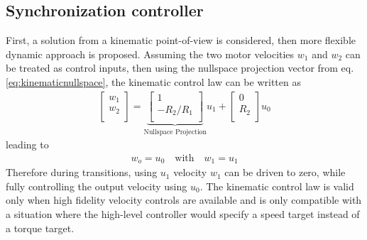 \subsection{Synchronization controller}
First, a solution from a kinematic point-of-view is considered, then more flexible dynamic approach is proposed. Assuming the two motor velocities $w_1$ and $w_2$ can be treated as control inputs, then using the nullspace projection vector from eq.\eqref{eq:kinematicnullspace}, the kinematic control law can be written as 
%
\begin{align}
\left[
\begin{array}{c}
w_1 \\
w_2 \\
\end{array}
\right]=
\underbrace{\left[
\begin{array}{c}
1 \\
-R_2/R_1 \\
\end{array}
\right]}_{\text{Nullspace Projection}}
u_1 + 
\left[
\begin{array}{c}
0 \\
R_2 \\
\end{array}
\right] u_0
\label{eq:kinematicsys}
\end{align}
%
leading to
%
\begin{align}
w_o = u_0 \quad \text{with} \quad w_1 = u_1
\end{align}
%
Therefore during transitions, using $u_1$ velocity $w_1$ can be driven to zero, while fully controlling the output velocity using $u_0$. The kinematic control law is valid only when high fidelity velocity controls are available and is only compatible with a situation where the high-level controller would specify a speed target instead of a torque target. 

